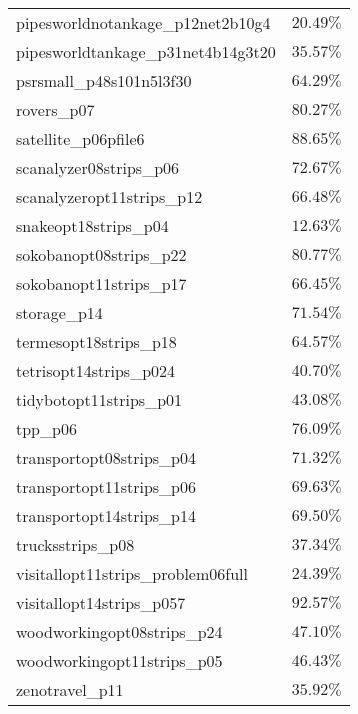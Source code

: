 \begin{tabular}{lr}
pipesworldnotankage\_p12net2b10g4 & $20.49\%$ \\
pipesworldtankage\_p31net4b14g3t20 & $35.57\%$ \\
psrsmall\_p48s101n5l3f30 & $64.29\%$ \\
rovers\_p07 & $80.27\%$ \\
satellite\_p06pfile6 & $88.65\%$ \\
scanalyzer08strips\_p06 & $72.67\%$ \\
scanalyzeropt11strips\_p12 & $66.48\%$ \\
snakeopt18strips\_p04 & $12.63\%$ \\
sokobanopt08strips\_p22 & $80.77\%$ \\
sokobanopt11strips\_p17 & $66.45\%$ \\
storage\_p14 & $71.54\%$ \\
termesopt18strips\_p18 & $64.57\%$ \\
tetrisopt14strips\_p024 & $40.70\%$ \\
tidybotopt11strips\_p01 & $43.08\%$ \\
tpp\_p06 & $76.09\%$ \\
transportopt08strips\_p04 & $71.32\%$ \\
transportopt11strips\_p06 & $69.63\%$ \\
transportopt14strips\_p14 & $69.50\%$ \\
trucksstrips\_p08 & $37.34\%$ \\
visitallopt11strips\_problem06full & $24.39\%$ \\
visitallopt14strips\_p057 & $92.57\%$ \\
woodworkingopt08strips\_p24 & $47.10\%$ \\
woodworkingopt11strips\_p05 & $46.43\%$ \\
zenotravel\_p11 & $35.92\%$ \\
\bottomrule
\end{tabular}
